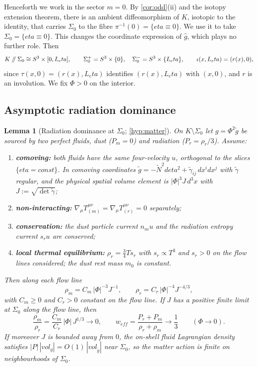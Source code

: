 \documentclass[11pt]{article}
\theoremstyle{canonmath}
\newtheorem{lemma}[theorem]{Lemma}
\theoremstyle{canonpostulate}
\theoremstyle{canonproposition}
\theoremstyle{canonmath}
\theoremstyle{canonproposition}
\providecommand{\cutK}{\Klein\mathbin{/\mkern-5mu/}\Sigma_0}
\providecommand{\Klein}{\mathcal{K}}
\def\mathrm#1{#1}%
\def\mathcal#1{#1}%
\def\eta{eta}%
\begin{document}
Henceforth we work in the sector $m = 0$. By \cref{cor:odd}(ii) and the isotopy extension theorem, there is an ambient diffeomorphism of $\Klein$, isotopic to the identity, that carries $\Sigma_0$ to the fibre $\pi^{-1}(0) = \{\eta \equiv 0\}$. We use it to take $\Sigma_0 = \{\eta\equiv0\}$. This changes the coordinate expression of $\hat g$, which plays no further role. Then
\begin{equation}
\cutK \cong S^3\times[0,L_\eta], \qquad \Sigma_0^+ = S^3\times\{0\}, \quad \Sigma_0^- = S^3\times\{L_\eta\}, \qquad \iota(x, L_\eta) = (r(x), 0),
\label{eq:cut}
\end{equation}
since $\tau(x,0) = (r(x), L_\eta)$ identifies $(r(x),L_\eta)$ with $(x,0)$, and $r$ is an involution. We fix $\Phi > 0$ on the interior.

\subsection{Asymptotic radiation dominance}

\begin{lemma}[Radiation dominance at $\Sigma_0$; \ref{hyp:matter}]\label{lem:raddom}
On $\Klein\setminus\Sigma_0$ let $g = \Phi^2\tilde{g}$ be sourced by two perfect fluids, dust ($P_m = 0$) and radiation ($P_r = \rho_r/3$). Assume:
\begin{enumerate}[label=(\roman*)]
\item \textbf{comoving:} both fluids have the same four-velocity $u$, orthogonal to the slices $\{\eta = \mathrm{const}\}$. In comoving coordinates $\tilde g = -\tilde N^2d\eta^2 + \tilde\gamma_{ij}\,dx^idx^j$ with $\tilde\gamma$ regular, and the physical spatial volume element is $|\Phi|^3J\,d^3x$ with $J := \sqrt{\det\tilde\gamma}$;
\item \textbf{non-interacting:} $\nabla_\mu T^{\mu\nu}_{(m)} = \nabla_\mu T^{\mu\nu}_{(r)} = 0$ separately;
\item \textbf{conservation:} the dust particle current $n_m u$ and the radiation entropy current $s_r u$ are conserved;
\item \textbf{local thermal equilibrium:} $\rho_r = \tfrac34 T s_r$ with $s_r \propto T^3$ and $s_r>0$ on the flow lines considered; the dust rest mass $m_0$ is constant.
\end{enumerate}
Then along each flow line
\begin{equation}
\rho_m = C_m\,|\Phi|^{-3}J^{-1}, \qquad \rho_r = C_r\,|\Phi|^{-4}J^{-4/3},
\label{eq:rhoJ}
\end{equation}
with $C_m\ge0$ and $C_r>0$ constant on the flow line. If $J$ has a positive finite limit at $\Sigma_0$ along the flow line, then
\begin{equation}
\frac{\rho_m}{\rho_r} = \frac{C_m}{C_r}\,|\Phi|\,J^{1/3} \to 0, \qquad w_{\mathrm{eff}} = \frac{P_r + P_m}{\rho_r + \rho_m} \to \frac13 \qquad (\Phi\to 0).
\label{eq:asymptotic_w}
\end{equation}
If moreover $J$ is bounded away from $0$, the on-shell fluid Lagrangian density satisfies $|P|\,|\mathrm{vol}_g| = O(1)\,|\mathrm{vol}_{\tilde g}|$ near $\Sigma_0$, so the matter action is finite on neighbourhoods of $\Sigma_0$.
\end{lemma}
\end{document}
